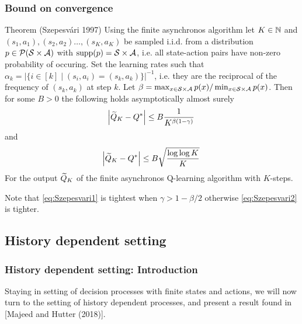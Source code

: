 \documentclass{beamer}[10]
\begin{document}
\begin{frame}
  \frametitle{Bound on convergence}
  \begingroup\scriptsize
  \begin{block}{Theorem (Szepesvári 1997)}
    Using the finite asynchronos algorithm
    let $K \in \mathbb{N}$ and
    $(s_1, a_1), (s_2, a_2) \dots, (s_K, a_K)$ be sampled i.i.d. from
    a distribution
    $p \in \mathcal{P}(\mathcal{S} \times \mathcal{A})$ with $\text{supp}(p) = \mathcal{S} \times \mathcal{A}$,
    i.e. all state-action pairs have non-zero probability of occuring.
    Set the learning rates such that
    $\alpha_k
    = |\{ i \in [k] \mid (s_i, a_i) = (s_k, a_k) \}|^{-1}$,
    i.e. they are the reciprocal of the frequency of $(s_k, a_k)$ at step $k$.
    Let $\beta = \max_{x \in \mathcal{S} \times \mathcal{A}} p(x) /
    \min_{x \in \mathcal{S} \times \mathcal{A}} p(x)$.
    Then for some $B > 0$ the following holds asymptotically almost
    surely
    \begin{equation}
      \abs{\widetilde{Q}_K - Q^*} \leq B \frac{1}{K^{\beta (1-\gamma)}}
      \label{eq:Szepesvari1}
    \end{equation}
    and
    \begin{equation}
      \abs{\widetilde{Q}_K - Q^*} \leq B \sqrt{\frac{\log \log K}{K}}
      \label{eq:Szepesvari2}
    \end{equation}
    For the output $\widetilde{Q}_K$ of the finite asynchronos Q-learning algorithm
    with $K$-steps.
  \end{block}
  Note that \cref{eq:Szepesvari1} is tightest when $\gamma > 1 - \beta/2$
  otherwise \cref{eq:Szepesvari2} is tighter.
  \endgroup
\end{frame}

\subsection{History dependent setting}

\begin{frame}
  \frametitle{History dependent setting: Introduction}
  Staying in setting of decision processes with finite states and actions,
  we will now turn to the setting of history dependent processes,
  and present a result found in [Majeed and Hutter (2018)].
\end{frame}
\end{document}
